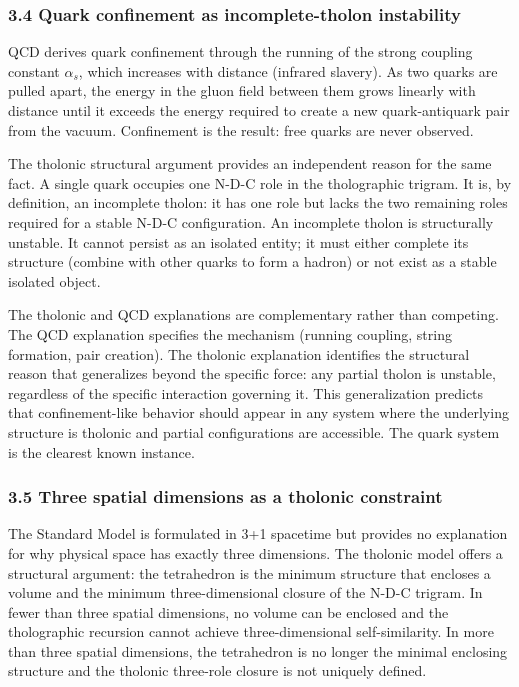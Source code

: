 \documentclass[
  11pt,
  letterpaper,
]{article}
\begin{document}
\subsubsection{3.4 Quark confinement as incomplete-tholon
instability}\label{quark-confinement-as-incomplete-tholon-instability}

QCD derives quark confinement through the running of the strong coupling
constant \(\alpha_s\), which increases with distance (infrared slavery).
As two quarks are pulled apart, the energy in the gluon field between
them grows linearly with distance until it exceeds the energy required
to create a new quark-antiquark pair from the vacuum. Confinement is the
result: free quarks are never observed.

The tholonic structural argument provides an independent reason for the
same fact. A single quark occupies one N-D-C role in the tholographic
trigram. It is, by definition, an incomplete tholon: it has one role but
lacks the two remaining roles required for a stable N-D-C configuration.
An incomplete tholon is structurally unstable. It cannot persist as an
isolated entity; it must either complete its structure (combine with
other quarks to form a hadron) or not exist as a stable isolated object.

The tholonic and QCD explanations are complementary rather than
competing. The QCD explanation specifies the mechanism (running
coupling, string formation, pair creation). The tholonic explanation
identifies the structural reason that generalizes beyond the specific
force: any partial tholon is unstable, regardless of the specific
interaction governing it. This generalization predicts that
confinement-like behavior should appear in any system where the
underlying structure is tholonic and partial configurations are
accessible. The quark system is the clearest known instance.

\subsubsection{3.5 Three spatial dimensions as a tholonic
constraint}\label{three-spatial-dimensions-as-a-tholonic-constraint}

The Standard Model is formulated in 3+1 spacetime but provides no
explanation for why physical space has exactly three dimensions. The
tholonic model offers a structural argument: the tetrahedron is the
minimum structure that encloses a volume and the minimum
three-dimensional closure of the N-D-C trigram. In fewer than three
spatial dimensions, no volume can be enclosed and the tholographic
recursion cannot achieve three-dimensional self-similarity. In more than
three spatial dimensions, the tetrahedron is no longer the minimal
enclosing structure and the tholonic three-role closure is not uniquely
defined.
\end{document}
